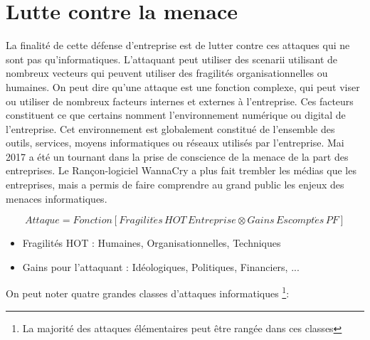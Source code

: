 \section{Lutte contre la menace}

La finalité de cette défense d’entreprise est de lutter contre ces attaques qui ne sont pas qu’informatiques. L’attaquant peut utiliser des scenarii utilisant de nombreux vecteurs qui peuvent utiliser des fragilités organisationnelles ou humaines. On peut dire qu’une attaque est une fonction complexe, qui peut viser ou utiliser de nombreux facteurs internes et externes à l’entreprise. Ces facteurs constituent ce que certains nomment l’environnement numérique ou digital de l’entreprise. Cet environnement est globalement constitué de l’ensemble des outils, services, moyens informatiques ou réseaux utilisés par l’entreprise.
Mai 2017 a été un tournant dans la prise de conscience de la menace de la part des entreprises. Le Rançon-logiciel WannaCry a plus fait trembler les médias que les entreprises, mais a permis de faire comprendre au grand public les enjeux des menaces informatiques.


\begin{nota}
\begin{equation}
Attaque = Fonction \left[ Fragilit\acute{e}s\,HOT\, Entreprise\otimes Gains\,Escompt\acute{e}s\,PF \right]
\end{equation}
\end{nota}

\begin{itemize}
	\item Fragilités HOT : Humaines, Organisationnelles, Techniques 
	\item Gains pour l'attaquant : Idéologiques, Politiques, Financiers, ...
\end{itemize}

On peut noter quatre grandes classes d’attaques informatiques \footnote{La majorité des attaques élémentaires peut être rangée dans ces classes}:

